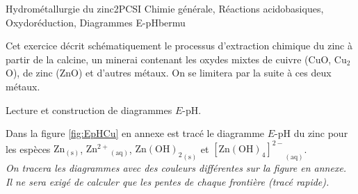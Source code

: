 
\begin{exercise}{Hydrométallurgie du zinc}{2}{PCSI}
{Chimie générale, Réactions acidobasiques, Oxydoréduction, Diagrammes E-pH}{bermu}

Cet exercice décrit schématiquement le processus d'extraction chimique du zinc à partir de la calcine, un minerai contenant les oxydes mixtes de cuivre (CuO, Cu$_2$O), de zinc (ZnO) et d'autres métaux. 
On se limitera par la suite à ces deux métaux.

\begin{questions}
\questioncours Lecture et construction de diagrammes $E$-pH.
\vspace{-1em}\begin{EnvUplevel}
Dans la figure \ref{fig:EpHCu} en annexe est tracé le diagramme $E$-pH du zinc pour les espèces $\mathrm{Zn_{(s)}}$, $\mathrm{{Zn^{2+}}_{(aq)}}$, $\mathrm{{Zn(OH)_2}_{(s)}}$ et $\mathrm{ {[Zn(OH)_4]^{2-}}_{(aq)}}$. \\[1ex]
\textsl{On tracera les diagrammes avec des couleurs différentes sur la figure en annexe. \\
Il ne sera exigé de calculer que les pentes de chaque frontière (tracé rapide).}
\end{EnvUplevel}


\end{questions}
\end{exercise}
